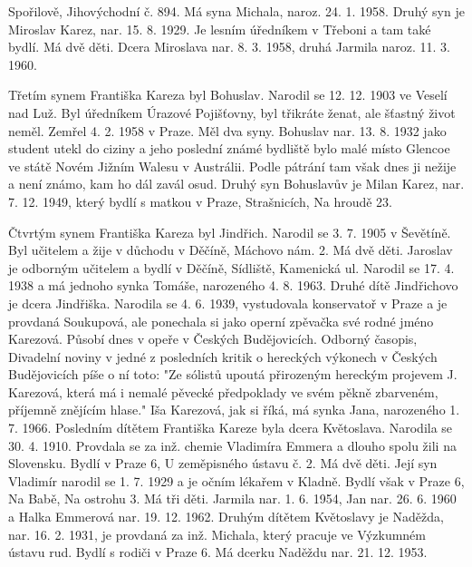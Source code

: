 \documentclass[../dejiny-rodu-prusiku.tex]{subfiles}
\begin{document}

Spořilově, Jihovýchodní č. 894. Má syna Michala, naroz. 24. 1. 1958. Druhý syn je Miroslav Karez, nar. 15. 8. 1929. Je lesním úředníkem v Třeboni a tam také bydlí. Má dvě děti. Dcera  Miroslava nar. 8. 3. 1958, druhá Jarmila naroz. 11. 3. 1960.

Třetím synem Františka Kareza byl Bohuslav. Narodil se 12. 12. 1903 ve Veselí nad Luž. Byl úředníkem Úrazové Pojišťovny, byl třikráte ženat, ale šťastný život neměl. Zemřel 4. 2. 1958 v Praze. Měl dva syny. Bohuslav nar. 13. 8. 1932 jako student utekl do ciziny a jeho poslední známé bydliště bylo malé místo Glencoe ve státě Novém Jižním Walesu v Austrálii. Podle pátrání tam však dnes ji nežije a není známo, kam ho dál zavál osud. Druhý syn Bohuslavův je Milan Karez, nar. 7. 12. 1949, který bydlí s matkou v Praze, Strašnicích, Na hroudě 23.

Čtvrtým synem Františka Kareza byl Jindřich. Narodil se 3. 7. 1905 v Ševětíně. Byl učitelem a žije v důchodu v Děčíně, Máchovo nám. 2. Má dvě děti. Jaroslav je odborným učitelem a bydlí v Děčíně, Sídliště, Kamenická ul. Narodil se 17. 4. 1938 a má jednoho synka Tomáše, narozeného 4. 8. 1963. Druhé dítě Jindřichovo je dcera Jindřiška. Narodila se 4. 6. 1939, vystudovala konservatoř v Praze a je provdaná Soukupová, ale ponechala si jako operní zpěvačka své rodné jméno Karezová. Působí dnes v opeře v Českých Budějovicích. Odborný časopis, Divadelní noviny v jedné z posledních kritik o hereckých výkonech v Českých Budějovicích píše o ní toto: "Ze sólistů upoutá přirozeným hereckým projevem J. Karezová, která má i nemalé pěvecké předpoklady ve svém pěkně zbarveném, příjemně znějícím hlase." Iša Karezová, jak si říká, má synka Jana, narozeného 1. 7. 1966. Posledním dítětem Františka Kareze byla dcera Květosla­va. Narodila se 30. 4. 1910. Provdala se za inž. chemie Vladimíra Emmera a dlouho spolu žili na Slovensku. Bydlí v Praze 6, U zeměpisného ústavu č. 2. Má dvě děti. Její syn Vladimír narodil se 1. 7. 1929 a je očním lékařem v Kladně. Bydlí však v Praze 6, Na Babě, Na ostrohu 3. Má tři děti. Jarmila nar. 1. 6. 1954, Jan nar. 26. 6. 1960 a Halka Emmerová nar. 19. 12. 1962. Druhým dítětem Květoslavy je Naděžda, nar. 16. 2. 1931, je provdaná za inž. Michala, který pracuje ve Výzkumném ústavu rud. Bydlí s rodiči v Praze 6. Má dcerku Naděždu nar. 21. 12. 1953.
\end{document}
